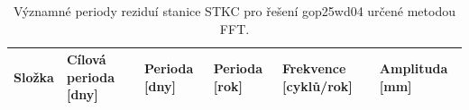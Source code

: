\begin{table}[htbp]
\caption{Významné periody reziduí stanice STKC pro řešení gop25wd04 určené metodou FFT.}
\label{tab:gop25wd04_stcd_stkc_detr_weighted_1seg_spectral_fft_significant_periods}
\begin{tabular}{llllll}
\toprule
Složka & Cílová perioda [dny] & Perioda [dny] & Perioda [rok] & Frekvence [cyklů/rok] & Amplituda [mm] \\
\midrule
\bottomrule
\end{tabular}
\end{table}
